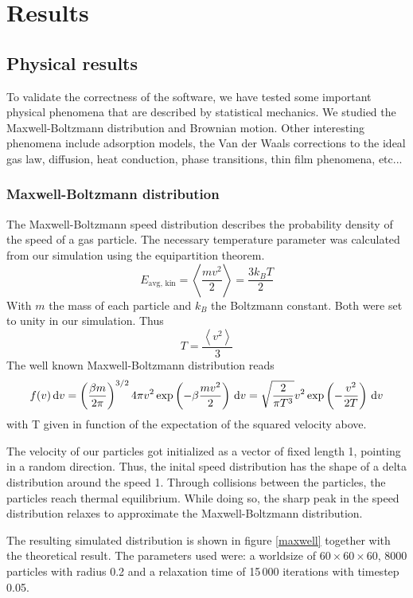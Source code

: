 \section{Results}
\subsection{Physical results}

To validate the correctness of the software, we have tested some important 
physical phenomena that are described by statistical mechanics. We studied the 
Maxwell-Boltzmann distribution and Brownian motion. Other interesting phenomena 
include adsorption models, the Van der Waals corrections to the ideal gas law, 
diffusion, heat conduction, phase transitions, thin film phenomena, etc...

\subsubsection{Maxwell-Boltzmann distribution}
The Maxwell-Boltzmann speed distribution describes the probability density of 
the speed of a gas particle. The necessary temperature parameter was calculated 
from our simulation using the equipartition theorem.
$$
E_{\textrm{avg, kin}} = \left< \frac{mv^2}{2} \right> = \frac{3k_BT}{2}
$$
With $m$ the mass of each particle and $k_B$ the Boltzmann constant. Both were 
set to unity in our simulation. Thus
$$
T = \frac{\left< v^2 \right>}{3}
$$
The well known Maxwell-Boltzmann distribution reads
$$
f(v)\,\mathrm d v = \left( \frac{\beta m}{2 \pi} \right)^{3/2} 4 \pi v^2
\exp\left( -\beta \frac{mv^2}{2}\right) \,\mathrm d v =
\sqrt{ \frac{2}{\pi T^3} } v^2 \exp \left(-\frac{v^2}{2T}\right) \,\mathrm d v
$$
with T given in function of the expectation of the squared velocity above.

The velocity of our particles got initialized as a vector of fixed length 
1, pointing in a random direction. Thus, the inital speed distribution has 
the shape of a delta distribution around the speed 1. Through collisions 
between the particles, the particles reach thermal equilibrium. While doing 
so, the sharp peak in the speed distribution relaxes to approximate the 
Maxwell-Boltzmann distribution.


The resulting simulated distribution is shown in figure \ref{maxwell} 
together with the theoretical result. The parameters used were: a worldsize 
of $60 \times 60 \times 60$, 8000 particles with radius 0.2 and a 
relaxation time of 15\,000 iterations with timestep 0.05.

